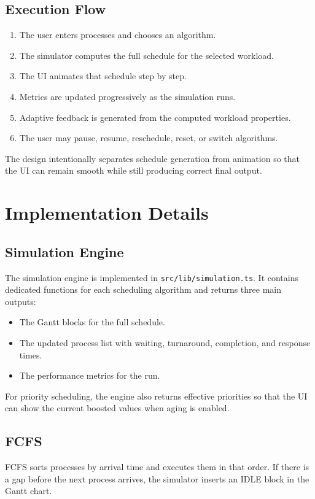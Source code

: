 \documentclass[12pt]{article}
\begin{document}
\subsection{Execution Flow}
\begin{enumerate}[leftmargin=*]
    \item The user enters processes and chooses an algorithm.
    \item The simulator computes the full schedule for the selected workload.
    \item The UI animates that schedule step by step.
    \item Metrics are updated progressively as the simulation runs.
    \item Adaptive feedback is generated from the computed workload properties.
    \item The user may pause, resume, reschedule, reset, or switch algorithms.
\end{enumerate}

The design intentionally separates schedule generation from animation so that the UI can remain smooth while still producing correct final output.

\section{Implementation Details}
\subsection{Simulation Engine}
The simulation engine is implemented in \texttt{src/lib/simulation.ts}. It contains dedicated functions for each scheduling algorithm and returns three main outputs:
\begin{itemize}[leftmargin=*]
    \item The Gantt blocks for the full schedule.
    \item The updated process list with waiting, turnaround, completion, and response times.
    \item The performance metrics for the run.
\end{itemize}

For priority scheduling, the engine also returns effective priorities so that the UI can show the current boosted values when aging is enabled.

\subsection{FCFS}
FCFS sorts processes by arrival time and executes them in that order. If there is a gap before the next process arrives, the simulator inserts an IDLE block in the Gantt chart.
\end{document}
